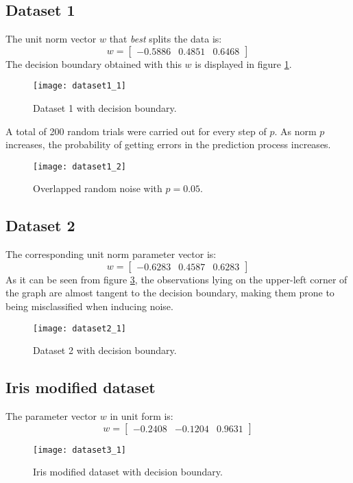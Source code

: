 \subsection{Dataset 1}
The unit norm vector $w$ that \textit{best} splits the data is:
\begin{equation}
w = \begin{bmatrix}
-0.5886 & 0.4851 & 0.6468
\end{bmatrix}
\end{equation}
%
The decision boundary obtained with this $w$ is displayed in figure \ref{dataset1_1}.
\begin{figure}[h]
	\centering
	\captionsetup{justification=centering}
	\texttt{[image: dataset1\_1]}
	\caption{Dataset 1 with decision boundary.}
	\label{dataset1_1}
\end{figure}

A total of 200 random trials were carried out for every step of $p$. As norm $p$ increases, the probability of getting errors in the prediction process increases.
\begin{figure}[h]
	\centering
	\captionsetup{justification=centering}
	\texttt{[image: dataset1\_2]}
	\caption{Overlapped random noise with $p = 0.05$.}
	\label{dataset1_2}
\end{figure}

\subsection{Dataset 2}
The corresponding unit norm parameter vector is:
\begin{equation}
w = \begin{bmatrix}
 -0.6283  &  0.4587  &  0.6283
\end{bmatrix}
\end{equation}
%
As it can be seen from figure \ref{dataset2_1}, the observations lying on the upper-left corner of the graph are almost tangent to the decision boundary, making them prone to being misclassified when inducing noise.
\begin{figure}[h]
	\centering
	\captionsetup{justification=centering}
	\texttt{[image: dataset2\_1]}
	\caption{Dataset 2 with decision boundary.}
	\label{dataset2_1}
\end{figure}

\subsection{Iris modified dataset}
The parameter vector $w$ in unit form is:
\begin{equation}
w = \begin{bmatrix}
-0.2408  &  -0.1204  &  0.9631
\end{bmatrix}
\end{equation}
%
\begin{figure}[h]
	\centering
	\captionsetup{justification=centering}
	\texttt{[image: dataset3\_1]}
	\caption{Iris modified dataset with decision boundary.}
	\label{dataset3_1}
\end{figure}

